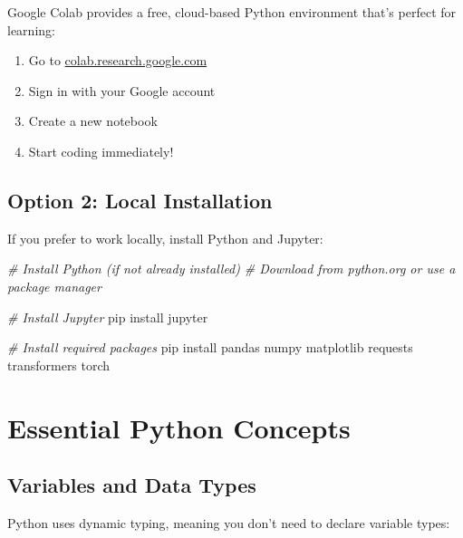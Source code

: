 \documentclass[
]{book}
\newenvironment{Shaded}{\begin{snugshade}}{\end{snugshade}}
\newcommand{\CommentTok}[1]{\textcolor[rgb]{0.56,0.35,0.01}{\textit{#1}}}
\newcommand{\ExtensionTok}[1]{#1}
\newcommand{\NormalTok}[1]{#1}
\providecommand{\tightlist}{%
  \setlength{\itemsep}{0pt}\setlength{\parskip}{0pt}}
\begin{document}
Google Colab provides a free, cloud-based Python environment that's perfect for learning:

\begin{enumerate}
\def\labelenumi{\arabic{enumi}.}
\tightlist
\item
  Go to \href{https://colab.research.google.com}{colab.research.google.com}
\item
  Sign in with your Google account
\item
  Create a new notebook
\item
  Start coding immediately!
\end{enumerate}

\subsection{Option 2: Local Installation}\label{option-2-local-installation}

If you prefer to work locally, install Python and Jupyter:

\begin{Shaded}
\begin{Highlighting}[]
\CommentTok{\# Install Python (if not already installed)}
\CommentTok{\# Download from python.org or use a package manager}

\CommentTok{\# Install Jupyter}
\ExtensionTok{pip}\NormalTok{ install jupyter}

\CommentTok{\# Install required packages}
\ExtensionTok{pip}\NormalTok{ install pandas numpy matplotlib requests transformers torch}
\end{Highlighting}
\end{Shaded}

\section{Essential Python Concepts}\label{essential-python-concepts}

\subsection{Variables and Data Types}\label{variables-and-data-types}

Python uses dynamic typing, meaning you don't need to declare variable types:
\end{document}

